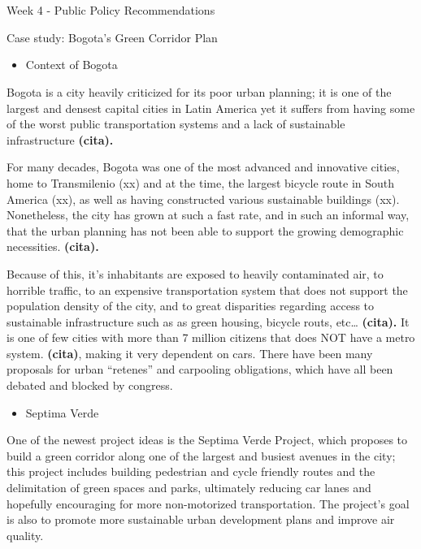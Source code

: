 \documentclass[
  letterpaper,
  DIV=11,
  numbers=noendperiod]{scrreprt}
\providecommand{\tightlist}{%
  \setlength{\itemsep}{0pt}\setlength{\parskip}{0pt}}\usepackage{longtable,booktabs,array}
\begin{document}

\hypertarget{section-3}{%
\chapter{}\label{section-3}}

Week 4 - Public Policy Recommendations

Case study: Bogota's Green Corridor Plan

\begin{itemize}
\tightlist
\item
  Context of Bogota
\end{itemize}

Bogota is a city heavily criticized for its poor urban planning; it is
one of the largest and densest capital cities in Latin America yet it
suffers from having some of the worst public transportation systems and
a lack of sustainable infrastructure \textbf{(cita).}

For many decades, Bogota was one of the most advanced and innovative
cities, home to Transmilenio (xx) and at the time, the largest bicycle
route in South America (xx), as well as having constructed various
sustainable buildings (xx). Nonetheless, the city has grown at such a
fast rate, and in such an informal way, that the urban planning has not
been able to support the growing demographic necessities.
\textbf{(cita).}

Because of this, it's inhabitants are exposed to heavily contaminated
air, to horrible traffic, to an expensive transportation system that
does not support the population density of the city, and to great
disparities regarding access to sustainable infrastructure such as as
green housing, bicycle routs, etc\ldots{} \textbf{(cita).} It is one of
few cities with more than 7 million citizens that does NOT have a metro
system. \textbf{(cita)}, making it very dependent on cars. There have
been many proposals for urban ``retenes'' and carpooling obligations,
which have all been debated and blocked by congress.

\begin{itemize}
\tightlist
\item
  Septima Verde
\end{itemize}

One of the newest project ideas is the Septima Verde Project, which
proposes to build a green corridor along one of the largest and busiest
avenues in the city; this project includes building pedestrian and cycle
friendly routes and the delimitation of green spaces and parks,
ultimately reducing car lanes and hopefully encouraging for more
non-motorized transportation. The project's goal is also to promote more
sustainable urban development plans and improve air quality.
\end{document}
